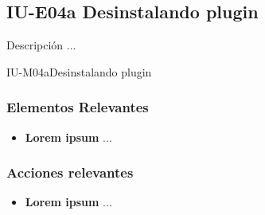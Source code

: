 
\subsection{IU-E04a Desinstalando plugin}

 Descripción ...

        {IU-M04a}{Desinstalando plugin}

\subsubsection{Elementos Relevantes}

    \begin{itemize}
    \item {\bf Lorem ipsum}
        ...
    \end{itemize}

\subsubsection{Acciones relevantes}

    \begin{itemize}
    \item {\bf Lorem ipsum}
        ...
    \end{itemize}

\clearpage
